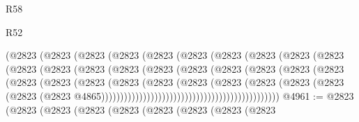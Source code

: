 \begin{lexlean}{R58}
\begin{lexlean}{R52}
\begin{coremodule}
{{{{{{{{{{{{{{{{{{{{{{{{{{{{{{{{{{{{{{{{{{{{{{{{{{{{{{{{{{{{{{{{{{{{{{{{{{{{{{{{{{{{{{{{{{{{{{{{{{{{{{{{{{{{{{{{{{{{{{{{{{{{{{{{{{{{{{{{{{{{{{{{{{{{{{{{{{{{{{{{{{{{{{{{{{{{{{{{{{{{{{{{{{{{{{{{{{{{{{                                  (@2823
                                    (@2823
                                      (@2823
                                        (@2823
                                          (@2823
                                            (@2823
                                              (@2823
                                                (@2823
                                                  (@2823
                                                    (@2823
                                                      (@2823
                                                        (@2823
                                                          (@2823
                                                            (@2823
                                                              (@2823
                                                                (@2823
                                                                  (@2823
                                                                    (@2823
                                                                      (@2823
                                                                        (@2823
                                                                          (@2823
                                                                            (@2823
                                                                              (@2823
                                                                                (@2823
                                                                                  (@2823
                                                                                    (@2823
                                                                                      (@2823
                                                                                        (@2823
                                                                                          (@2823
                                                                                            (@2823
                                                                                              (@2823
                                                                                                (@2823
                                                                                                  @4865)))))))))))))))))))))))))))))))))))))))))))))))
@4961 := @2823
    (@2823
      (@2823
        (@2823
          (@2823
            (@2823
              (@2823
                (@2823
                  (@2823
}}}}}}}}}}}}}}}}}}}}}}}}}}}}}}}}}}}}}}}}}}}}}}}}}}}}}}}}}}}}}}}}}}}}}}}}}}}}}}}}}}}}}}}}}}}}}}}}}}}}}}}}}}}}}}}}}}}}}}}}}}}}}}}}}}}}}}}}}}}}}}}}}}}}}}}}}}}}}}}}}}}}}}}}}}}}}}}}}}}}}}}}}}}}}}}}}}}}}}
\end{coremodule}
\end{lexlean}
\end{lexlean}
